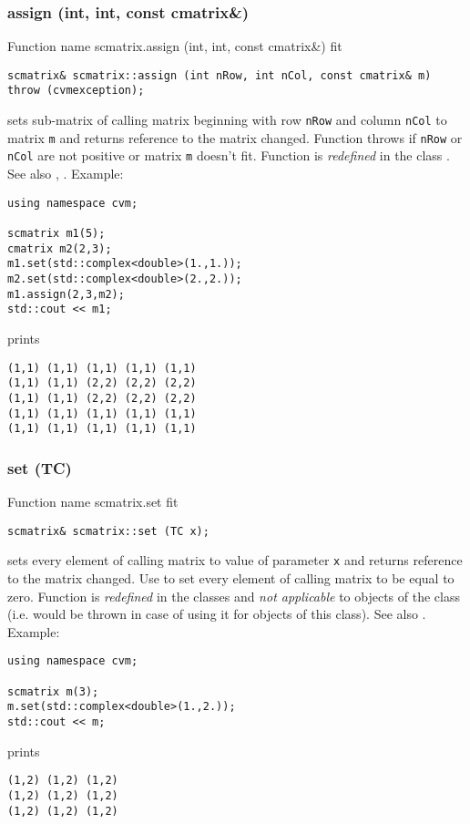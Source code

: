\subsubsection{assign (int, int, const cmatrix\&)}
Function%
\pdfdest name {scmatrix.assign (int, int, const cmatrix&)} fit
\begin{verbatim}
scmatrix& scmatrix::assign (int nRow, int nCol, const cmatrix& m)
throw (cvmexception);
\end{verbatim}
sets sub-matrix of  calling matrix beginning with \Based row
\verb"nRow" and column \verb"nCol" to  matrix \verb"m" and
returns  reference to the matrix changed. Function throws 
  if \verb"nRow"
or \verb"nCol" are not positive or matrix \verb"m" doesn't fit.
Function is \emph{redefined} in the class
.
See also , .
Example:
\begin{Verbatim}
using namespace cvm;

scmatrix m1(5);
cmatrix m2(2,3);
m1.set(std::complex<double>(1.,1.));
m2.set(std::complex<double>(2.,2.));
m1.assign(2,3,m2);
std::cout << m1;
\end{Verbatim}
prints
\begin{Verbatim}
(1,1) (1,1) (1,1) (1,1) (1,1)
(1,1) (1,1) (2,2) (2,2) (2,2)
(1,1) (1,1) (2,2) (2,2) (2,2)
(1,1) (1,1) (1,1) (1,1) (1,1)
(1,1) (1,1) (1,1) (1,1) (1,1)
\end{Verbatim}
\newpage



\subsubsection{set (TC)}
Function%
\pdfdest name {scmatrix.set} fit
\begin{verbatim}
scmatrix& scmatrix::set (TC x);
\end{verbatim}
sets every element of  calling matrix to  value of
parameter \verb"x" and returns  reference to
the matrix changed.
Use  to set every element
of  calling matrix to be equal to zero.
Function is \emph{redefined} in the classes
 and
\emph{not applicable} to objects of the class
 (i.e.  would be thrown
in case of using it for objects of this class).
See also .
Example:
\begin{Verbatim}
using namespace cvm;

scmatrix m(3);
m.set(std::complex<double>(1.,2.));
std::cout << m;
\end{Verbatim}
prints
\begin{Verbatim}
(1,2) (1,2) (1,2)
(1,2) (1,2) (1,2)
(1,2) (1,2) (1,2)
\end{Verbatim}
\newpage




